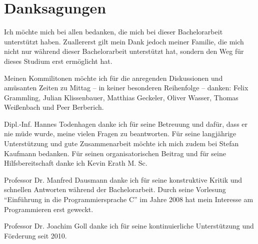 
\chapter*{Danksagungen}

Ich möchte mich bei allen bedanken, die mich bei dieser Bachelorarbeit unterstützt haben.
Zuallererst gilt mein Dank jedoch meiner Familie, die mich nicht nur während dieser Bachelorarbeit unterstützt hat, sondern den Weg für dieses Studium erst ermöglicht hat.

Meinen Kommilitonen möchte ich für die anregenden Diskussionen und amüsanten Zeiten zu Mittag -- in keiner besonderen Reihenfolge -- danken:
Felix Grammling,
Julian Klissenbauer,
Matthias Geckeler,
Oliver Wasser,
Thomas Weißenbach und
Peer Berberich.



Dipl.-Inf. Hannes Todenhagen danke ich für seine Betreuung und dafür, dass er nie müde wurde, meine vielen Fragen zu beantworten.%
Für seine langjährige Unterstützung und gute Zusammenarbeit möchte ich mich zudem bei  Stefan Kaufmann bedanken.
Für seinen organisatorischen Beitrag und für seine Hilfsbereitschaft danke ich Kevin Erath M. Sc.

Professor Dr. Manfred Dausmann danke ich für seine konstruktive Kritik und schnellen Antworten während der Bachelorarbeit. Durch seine Vorlesung \enquote{Einführung in die Programmiersprache C} im Jahre 2008 hat mein Interesse am Programmieren erst geweckt.

Professor Dr. Joachim Goll danke ich für seine kontinuierliche Unterstützung und Förderung seit 2010.
